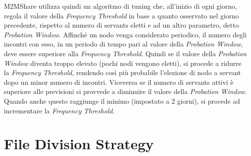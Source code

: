 M2MShare utilizza quindi un algoritmo di tuning che, all'inizio di ogni giorno, regola il valore della \textit{Frequency Threshold} in base a quanto osservato nel giorno precedente, rispetto al numero di servants eletti e ad un altro parametro, detto \textit{Probation Window}. Affinché un nodo venga considerato periodico, il numero degli incontri con esso, in un periodo di tempo pari al valore della \textit{Probation Window}, deve essere superiore alla \textit{Frequency Threshold}. Quindi se il valore della \textit{Probation Window} diventa troppo elevato (pochi nodi vengono eletti), si procede a ridurre la \textit{Frequency Threshold}, rendendo così più probabile l'elezione di nodo a servant dopo un minor numero di incontri. Viceversa se il numero di servants attivi è superiore alle previsioni si provvede a diminuire il valore della \textit{Probation Window}. Quando anche questo raggiunge il minimo (impostato a 2 giorni), si procede ad incrementare la \textit{Frequency Threshold}.
\\



\section{File Division Strategy}
\label{descrFileDivisionStrategy}
 

